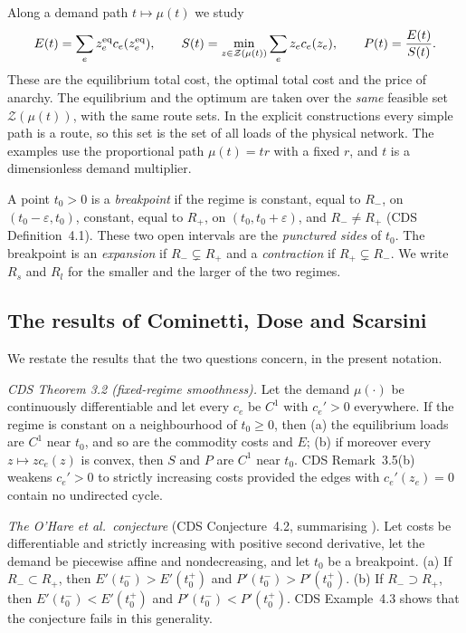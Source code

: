 Along a demand path $t\mapsto\mu(t)$ we study
\begin{equation}\label{eq:objectives}
 E(t)=\sum_e z^{\mathrm{eq}}_e c_e(z^{\mathrm{eq}}_e),\qquad
 S(t)=\min_{z\in\mathcal Z(\mu(t))}\sum_e z_e c_e(z_e),\qquad
 P(t)=\frac{E(t)}{S(t)}.
\end{equation}
These are the equilibrium total cost, the optimal total cost and the price of anarchy. The equilibrium and the optimum are taken over the \emph{same} feasible set $\mathcal Z(\mu(t))$, with the same route sets. In the explicit constructions every simple path is a route, so this set is the set of all loads of the physical network. The examples use the proportional path $\mu(t)=tr$ with a fixed $r$, and $t$ is a dimensionless demand multiplier.

\begin{definition}[Breakpoints]\label{def:breakpoint}
A point $t_0>0$ is a \emph{breakpoint} if the regime is constant, equal to $R_-$, on $(t_0-\varepsilon,t_0)$, constant, equal to $R_+$, on $(t_0,t_0+\varepsilon)$, and $R_-\ne R_+$ (CDS Definition~4.1). These two open intervals are the \emph{punctured sides} of $t_0$. The breakpoint is an \emph{expansion} if $R_-\subsetneq R_+$ and a \emph{contraction} if $R_+\subsetneq R_-$. We write $R_s$ and $R_l$ for the smaller and the larger of the two regimes.
\end{definition}

\subsection{The results of Cominetti, Dose and Scarsini}

We restate the results that the two questions concern, in the present notation.

\emph{CDS Theorem 3.2 (fixed-regime smoothness).} Let the demand $\mu(\cdot)$ be continuously differentiable and let every $c_e$ be $C^1$ with $c_e'>0$ everywhere. If the regime is constant on a neighbourhood of $t_0\ge0$, then (a) the equilibrium loads are $C^1$ near $t_0$, and so are the commodity costs and $E$; (b) if moreover every $z\mapsto zc_e(z)$ is convex, then $S$ and $P$ are $C^1$ near $t_0$. CDS Remark~3.5(b) weakens $c_e'>0$ to strictly increasing costs provided the edges with $c_e'(z_e)=0$ contain no undirected cycle.

\emph{The O'Hare et al.\ conjecture} (CDS Conjecture~4.2, summarising \cite[Conjectures 4.5, 4.6, 4.9]{OCW2016}). Let costs be differentiable and strictly increasing with positive second derivative, let the demand be piecewise affine and nondecreasing, and let $t_0$ be a breakpoint. (a) If $R_-\subset R_+$, then $E'(t_0^-)>E'(t_0^+)$ and $P'(t_0^-)>P'(t_0^+)$. (b) If $R_-\supset R_+$, then $E'(t_0^-)<E'(t_0^+)$ and $P'(t_0^-)<P'(t_0^+)$. CDS Example~4.3 shows that the conjecture fails in this generality.

